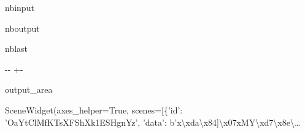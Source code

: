 \documentclass[letterpaper,10pt,english]{sphinxmanual}
\begin{document}
\begin{sphinxuseclass}{nbinput}
{
\begin{sphinxVerbatim}[commandchars=\\\{\}]
\llap{\color{nbsphinxin}[13]:\,\hspace{\fboxrule}\hspace{\fboxsep}}
 
              
             
              
\end{sphinxVerbatim}
}

\end{sphinxuseclass}
\begin{sphinxuseclass}{nboutput}
\begin{sphinxuseclass}{nblast}
{

\kern-\sphinxverbatimsmallskipamount\kern-\baselineskip
\kern+\FrameHeightAdjust\kern-\fboxrule
\vspace{\nbsphinxcodecellspacing}

\begin{sphinxuseclass}{output_area}
\begin{sphinxuseclass}{}


\begin{sphinxVerbatim}[commandchars=\\\{\}]
\llap{\color{nbsphinxout}[13]:\,\hspace{\fboxrule}\hspace{\fboxsep}}SceneWidget(axes\_helper=True, scenes=[\{'id': 'OaYtClMfKTsXFShXk1ESHgnYz', 'data': b'x\textbackslash{}xda\textbackslash{}x84]\textbackslash{}x07xMY\textbackslash{}xd7\textbackslash{}x8e\textbackslash{}…
\end{sphinxVerbatim}



\end{sphinxuseclass}
\end{sphinxuseclass}
}

\end{sphinxuseclass}
\end{sphinxuseclass}
\end{document}
